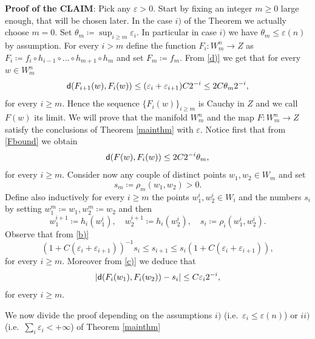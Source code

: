 \documentclass[11pt]{article}
\newcommand{\eps}{\varepsilon}
\newcommand{\sfd}{{\sf d}}
\theoremstyle{plain}
\theoremstyle{definition}
\numberwithin{equation}{section}
\begin{document}
{\textbf {Proof of the CLAIM}}:
Pick any $\eps>0$. Start by fixing an integer $m\ge 0$ large enough, that will be chosen later. In the case $i)$ of the Theorem we actually choose $m=0.$ Set $\theta_m\coloneqq\sup_{i\ge m} \eps_i$. In particular in case $i)$ we have $\theta_m\le \eps(n)$ by assumption.
For every $i > m$ define the function $F_i:W^n_{m}\to Z$ as $F_i\coloneqq f_i \circ h_{i-1}\circ...\circ h_{m+1}\circ  h_{m}$  and set $F_m\coloneqq f_m.$ From \ref{d)} we get that for every $w \in W_m^n$
\begin{equation}\label{Fbound}
	\sfd(F_{i+1}(w),F_i(w))\le (\eps_i+\eps_{i+1})C2^{-i}\le 2C\theta_m2^{-i},
\end{equation}
for every $i \ge m.$
Hence the sequence $\{F_i(w)\}_{i\ge m}$ is Cauchy in $Z$ and we call $F(w)$ its limit. We will prove that the manifold $W_m^n$	and the map $F: W_m^n \to Z$ satisfy the conclusions of Theorem \ref{mainthm} with $\eps$. Notice first that from \eqref{Fbound} we obtain 
\begin{equation}\label{fif}
	\sfd(F(w),F_i(w))\le  2C2^{-i}\theta_m,
\end{equation} 
for every $i \ge m.$
Consider now any couple of distinct points $w_1,w_2 \in W_m$  and set
\[s_m\coloneqq\rho_m(w_1,w_2)>0.\]
Define also inductively for every $i\ge m$ the points $w_1^i,w_2^i \in W_i$ and the numbers $s_i$ by setting $w_1^m\coloneqq w_1, w_2^m\coloneqq w_2$ and then
\[w_1^{i+1}\coloneqq h_{i}(w_1^i),\quad w_2^{i+1}\coloneqq h_{i}(w_2^i), \quad  s_i\coloneqq\rho_i(w_1^i,w_2^i).\]
Observe that from \ref{b)} 
\begin{equation}\label{eq:silip}
    (1+C(\eps_i+\eps_{i+1}))^{-1}s_i\le s_{i+1}\le s_{i}(1+C(\eps_i+\eps_{i+1})),
\end{equation}
for every $i \ge m$. Moreover from \ref{c)} we deduce that 
\begin{equation}\label{rofi}
	|\sfd(F_i(w_1),F_i(w_2))-s_i|\le C \eps_i2^{-i},
\end{equation}
for every $i\ge  m$. 

We now divide the proof depending on the assumptions $i)$ (i.e.\ $\eps_i\le \eps(n)$) or $ii)$ (i.e.\ $\sum_i \eps_i<+\infty$) of Theorem \ref{mainthm}
\end{document}
